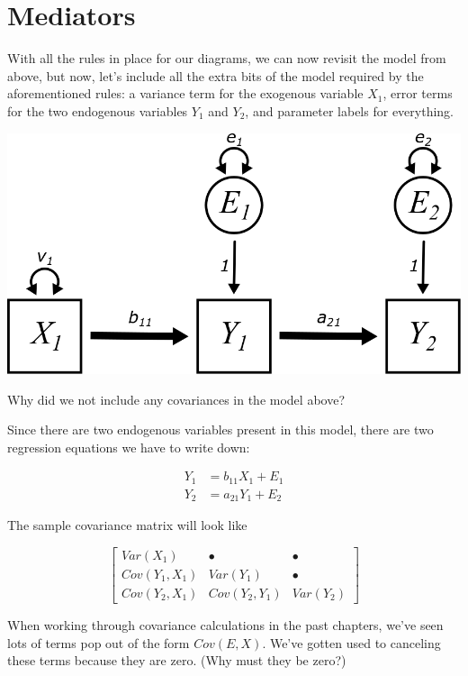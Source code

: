 \documentclass[
]{book}
\begin{document}
\hypertarget{mediation-mediators}{%
\section{Mediators}\label{mediation-mediators}}

With all the rules in place for our diagrams, we can now revisit the model from above, but now, let's include all the extra bits of the model required by the aforementioned rules: a variance term for the exogenous variable \(X_{1}\), error terms for the two endogenous variables \(Y_{1}\) and \(Y_{2}\), and parameter labels for everything.

\begin{center}\includegraphics{graphics/mediator_vars} \end{center}

Why did we not include any covariances in the model above?

Since there are two endogenous variables present in this model, there are two regression equations we have to write down:

\begin{align}
Y_{1} &= b_{11}X_{1} + E_{1}        \\
Y_{2} &= a_{21}Y_{1} + E_{2}
\end{align}

The sample covariance matrix will look like

\[
\begin{bmatrix}
Var(X_{1})          &   \bullet             &   \bullet \\
Cov(Y_{1}, X_{1})   &   Var(Y_{1})          &   \bullet \\
Cov(Y_{2}, X_{1})   &   Cov(Y_{2}, Y_{1})   &   Var(Y_{2})
\end{bmatrix}
\]

When working through covariance calculations in the past chapters, we've seen lots of terms pop out of the form \(Cov(E, X)\). We've gotten used to canceling these terms because they are zero. (Why must they be zero?)
\end{document}
